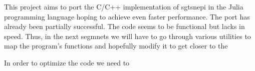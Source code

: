 This project aims to port the C/C++ implementation of sgtsnepi in the Julia programming language hoping 
to achieve even faster performance. The port has already been partially successful. The code seems to be 
functional but lacks in speed. Thus, in the next segmnets we will have to go through various utilities to 
map the program's functions and hopefully modify it to get closer to the  

In order to optimize the code we need to 